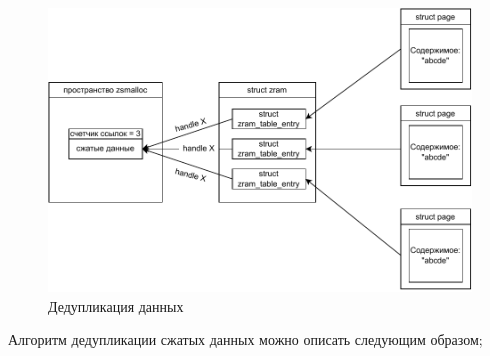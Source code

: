 \documentclass[12pt, a4paper]{article}
\begin{document}
\begin{figure}[h]
	\centering
	\includegraphics[width=\textwidth]{img/zram-no-duplicates.pdf}
	\caption{Дедупликация данных}
	\label{fig:zram-no-duplicates}
\end{figure}

Алгоритм дедупликации сжатых данных можно описать следующим образом;
\end{document}
